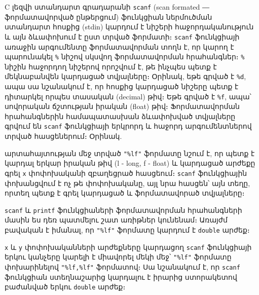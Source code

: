 C լեզվի ստանդարտ գրադարանի \texttt{scanf} (scan formated ― ֆորմատավորված
ընթերցում) ֆունկցիան ներմուծման ստանդարտ հոսքից (stdin) կարդում է նիշերի
հաջորդականություն և այն ձևափոխում է ըստ տրված ֆորմատի։ \texttt{scanf}
ֆունկցիայի առաջին արգումենտը ֆորմատավորման տողն է, որ կարող է պարունակել
\texttt{\%} նիշով սկսվող ֆորմատավորման հրահանգներ։ \texttt{\%} նիշին
հաջորդող նիշերով որոշվում է, թե ինչպես պետք է մեկնաբանվեն կարդացած
տվյալները։ Օրինակ, եթե գրված է \texttt{\%d}, ապա սա նշանակում է, որ
հոսքից կարդացած նիշերը պետք է դիտարկել որպես տասական (decimal) թիվ։ Եթե
գրված է \texttt{\%f}, ապա՝ սովորական ճշտության իրական (float) թիվ։
Ֆորմատավորման հրահանգներին համապատասխան ձևափոխված տվյալները գրվում են
\texttt{scanf} ֆունկցիայի երկրորդ և հաջորդ արգումենտներով տրված
հասցեներում։ Օրինակ.

\begin{Shaded}
\begin{Highlighting}[]
\end{Highlighting}
\end{Shaded}

արտահայտության մեջ տրված \texttt{"\%lf"} ֆորմատը նշում է, որ պետք է
կարդալ երկար իրական թիվ (l - long, f - float) և կարդացած արժեքը գրել
\texttt{x} փոփոխականի զբաղեցրած հասցեում։ \texttt{scanf} ֆունկցիային
փոխանցվում է ոչ թե փոփոխականը, այլ նրա հասցեն՝ այն տեղը, որտեղ պետք է
գրել կարդացած և ֆորմատավորած տվյալները։

\texttt{scanf} և \texttt{printf} ֆունկցիաների ֆորմատավորման հրահանգների
մասին ես դեռ պատմելու շատ առիթներ կունենամ։ Առայժմ բավական է իմանալ, որ
\texttt{"\%lf"} ֆորմատը կարդում է \texttt{double} արժեք։

\texttt{x} և \texttt{y} փոփոխականների արժեքները կարդացող \texttt{scanf}
ֆունկցիայի երկու կանչերը կարելի է միավորել մեկի մեջ՝ \texttt{"\%lf"}
ֆորմատը փոխարինելով \texttt{"\%lf,\%lf"} ֆորմատով։ Սա նշանակում է, որ
\texttt{scanf} ֆունկցիան ստեղնաշարից կարդալու է իրարից ստորակետով
բաժանված երկու \texttt{double} արժեք։

\begin{Shaded}
\begin{Highlighting}[]
\NormalTok{;}
\end{Highlighting}
\end{Shaded}

